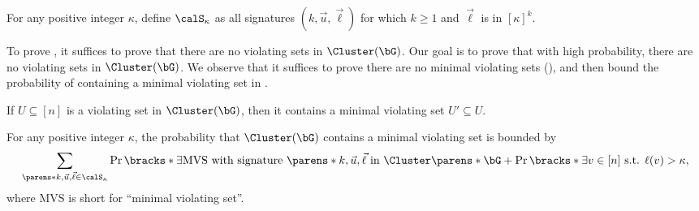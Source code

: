 \documentclass[11pt,letterpaper]{article}
\begin{document}
    \begin{notation*}[{$\calS_{\kappa}$}]
        For any positive integer $\kappa$, define $\calS_{\kappa}$ as all signatures $({k,\vec{u},\vec{\ell}})$ for which $k\ge 1$ and $\vec{\ell}$ is in $[\kappa]^{k}$.
    \end{notation*}

    
    To prove , it suffices to prove that there are no violating sets in $\Cluster(\bG)$. %
    Our goal is to prove that with high probability, there are no violating sets in $\Cluster(\bG)$.
    We observe that it suffices to prove there are no minimal violating sets (), and then bound the probability of containing a minimal violating set in .
    \begin{observation} \label{obs:min-violating-set}
        If $U\subseteq[n]$ is a violating set in $\Cluster(\bG)$, then it contains a minimal violating set $U'\subseteq U$. %
    \end{observation}
    \begin{observation} \label{obs:MVS-bound}
        For any positive integer $\kappa$, the probability that $\Cluster(\bG)$ contains a minimal violating set is bounded by
        \[
            \sum_{\parens*{k,\vec{u},\vec{\ell}}\in\calS_{\kappa}} \Pr\bracks*{\exists\text{MVS with signature }\parens*{k,\vec{u},\vec{\ell}}\text{ in }\Cluster\parens*{\bG} } + \Pr\bracks*{\exists v\in[n]\text{ s.t. }\ell(v) > \kappa},
        \]
        where MVS is short for ``minimal violating set''.
    \end{observation}
\end{document}
